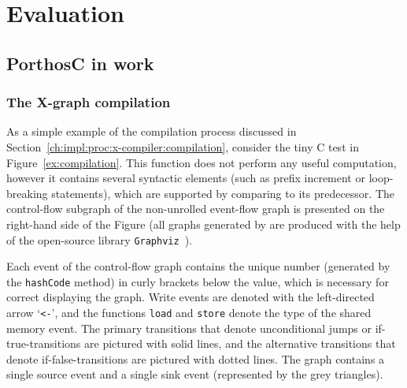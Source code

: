 \chapter{Evaluation}
\label{ch:eval}


\section{PorthosC in work}
\label{ch:eval:show}

\subsection{The X-graph compilation}
\label{ch:eval:show:compil}

As a simple example of the compilation process discussed in Section~\ref{ch:impl:proc:x-compiler:compilation}, consider the tiny C test in Figure~\ref{ex:compilation}.
This function does not perform any useful computation, however it contains several syntactic elements (such as prefix increment or loop-breaking statements), which are supported by \porthos[2] comparing to its predecessor.
The control-flow subgraph \xgraph[CF] of the non-unrolled event-flow graph is presented on the right-hand side of the Figure (all graphs generated by \porthos[2] are produced with the help of the open-source library \texttt{Graphviz}~\cite{ellson2001graphviz}).

Each event of the control-flow graph contains the unique number (generated by the \texttt{hashCode} method) in curly brackets below the value, which is necessary for correct displaying the graph.
Write events are denoted with the left-directed arrow `\lstinline{<-}', and the functions \lstinline{load} and \lstinline{store} denote the type of the shared memory event.
The primary transitions that denote unconditional jumps or if-true-transitions are pictured with solid lines, and the alternative transitions that denote if-false-transitions are pictured with dotted lines.
The graph contains a single source event and a single sink event (represented by the grey triangles).

